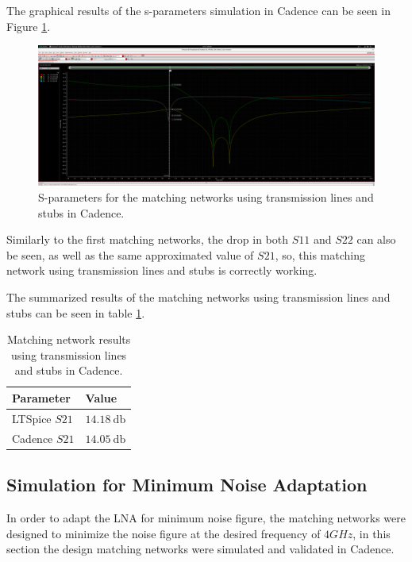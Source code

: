 The graphical results of the s-parameters simulation in Cadence can be seen in Figure \ref{fig:SIMLSMatching}.
\begin{figure}[H]
    \centering
    \includegraphics[width=1\textwidth]{Images/CAD-LinesmatchGain.png}
    \caption{S-parameters for the matching networks using transmission lines and stubs in Cadence.}
    \label{fig:SIMLSMatching}
\end{figure}

Similarly to the first matching networks, the drop in both $S11$ and $S22$ can also be seen, as well as the same approximated value of $S21$, so, this matching network using transmission lines and stubs is correctly working. 

The summarized results of the matching networks using transmission lines and stubs can be seen in table \ref{tab:LSMatchingParameters}.
\begin{table}[H]
    \centering
    \caption{Matching network results using transmission lines and stubs in Cadence.}
    \begin{tabularx}{\textwidth}{>{\centering\arraybackslash}X >{\centering\arraybackslash}X}
        \toprule
        \textbf{Parameter} & \textbf{Value} \\
        \midrule
        LTSpice $S21$  & $\SI{14.18}{\decibel}$ \\
        \midrule
        Cadence $S21$ & $\SI{14.05}{\decibel}$ \\
        \bottomrule
    \end{tabularx}
    \label{tab:LSMatchingParameters}
\end{table}

\subsection{Simulation for Minimum Noise Adaptation}

In order to adapt the LNA for minimum noise figure, the matching networks were designed to minimize the noise figure at the desired frequency of $4 GHz$, in this section the design matching networks were simulated and validated in Cadence.

